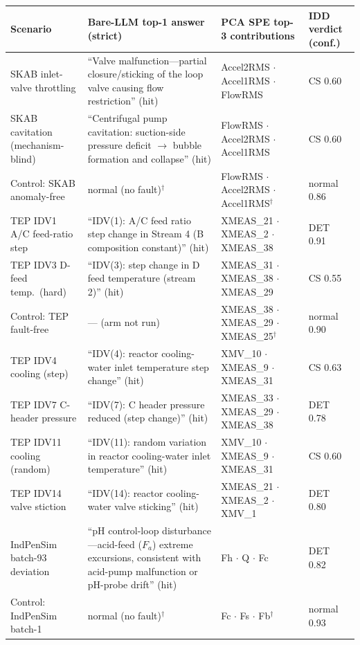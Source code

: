\documentclass[preprint,12pt]{elsarticle}
\newcommand{\preprinttabfit}{\scriptsize\selectfont}%
\newcommand{\preprinttabfit}{}%
\begin{document}
\begin{table}[!t]
\label{tab:baselinedetail}
\centering
\footnotesize\setlength{\tabcolsep}{2.6pt}\renewcommand{\arraystretch}{1.02}\preprinttabfit
\begin{tabular}{@{}>{\raggedright\arraybackslash}p{2.3cm}>{\raggedright\arraybackslash}p{4.3cm}>{\raggedright\arraybackslash}p{3.4cm}>{\raggedright\arraybackslash}p{1.5cm}@{}}
\toprule
Scenario & Bare-LLM top-1 answer (strict) & PCA SPE top-3 contributions & IDD verdict (conf.) \\
\midrule
SKAB inlet-valve throttling & ``Valve malfunction---partial closure/sticking of the loop valve causing flow restriction'' (hit) & Accel2RMS $\cdot$ Accel1RMS $\cdot$ FlowRMS & CS 0.60 \\
SKAB cavitation (mechanism-blind) & ``Centrifugal pump cavitation: suction-side pressure deficit $\to$ bubble formation and collapse'' (hit) & FlowRMS $\cdot$ Accel2RMS $\cdot$ Accel1RMS & CS 0.60 \\
Control: SKAB anomaly-free & normal (no fault)$^\dagger$ & FlowRMS $\cdot$ Accel2RMS $\cdot$ Accel1RMS$^\dagger$ & normal 0.86 \\
\midrule
TEP IDV1 A/C feed-ratio step & ``IDV(1): A/C feed ratio step change in Stream 4 (B composition constant)'' (hit) & XMEAS\_21 $\cdot$ XMEAS\_2 $\cdot$ XMEAS\_38 & DET 0.91 \\
TEP IDV3 D-feed temp.\ (hard) & ``IDV(3): step change in D feed temperature (stream 2)'' (hit) & XMEAS\_31 $\cdot$ XMEAS\_38 $\cdot$ XMEAS\_29 & CS 0.55 \\
Control: TEP fault-free & --- (arm not run) & XMEAS\_38 $\cdot$ XMEAS\_29 $\cdot$ XMEAS\_25$^\dagger$ & normal 0.90 \\
TEP IDV4 cooling (step) & ``IDV(4): reactor cooling-water inlet temperature step change'' (hit) & XMV\_10 $\cdot$ XMEAS\_9 $\cdot$ XMEAS\_31 & CS 0.63 \\
TEP IDV7 C-header pressure & ``IDV(7): C header pressure reduced (step change)'' (hit) & XMEAS\_33 $\cdot$ XMEAS\_29 $\cdot$ XMEAS\_38 & DET 0.78 \\
TEP IDV11 cooling (random) & ``IDV(11): random variation in reactor cooling-water inlet temperature'' (hit) & XMV\_10 $\cdot$ XMEAS\_9 $\cdot$ XMEAS\_31 & CS 0.60 \\
TEP IDV14 valve stiction & ``IDV(14): reactor cooling-water valve sticking'' (hit) & XMEAS\_21 $\cdot$ XMEAS\_2 $\cdot$ XMV\_1 & DET 0.80 \\
\midrule
IndPenSim batch-93 deviation & ``pH control-loop disturbance---acid-feed ($F_a$) extreme excursions, consistent with acid-pump malfunction or pH-probe drift'' (hit) & Fh $\cdot$ Q $\cdot$ Fc & DET 0.82 \\
Control: IndPenSim batch-1 & normal (no fault)$^\dagger$ & Fc $\cdot$ Fs $\cdot$ Fb$^\dagger$ & normal 0.93 \\
\bottomrule
\end{tabular}
\end{table}
\end{document}
